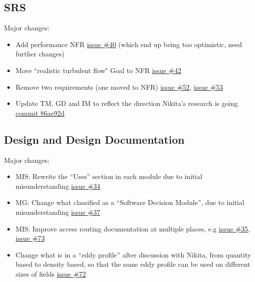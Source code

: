 \documentclass{article}
\begin{document}

\subsection{SRS}
Major changes:
\begin{itemize}
    \item Add performance NFR \href{https://github.com/omltcat/turbulent-flow/issues/40}{issue \#40} (which end up being too optimistic, need further changes)
    \item Move ``realistic turbulent flow" Goal to NFR \href{https://github.com/omltcat/turbulent-flow/issues/42}{issue \#42}
    \item Remove two requirements (one moved to NFR) \href{https://github.com/omltcat/turbulent-flow/issues/52}{issue \#52}, \href{https://github.com/omltcat/turbulent-flow/issues/53}{issue \#53}
    \item Update TM, GD and IM to reflect the direction Nikita's research is going \href{https://github.com/omltcat/turbulent-flow/commit/86ae92d744d9f19878fc19d52f57f824410bddc9}{commit 86ae92d}
\end{itemize}

\subsection{Design and Design Documentation}
Major changes:
\begin{itemize}
    \item MIS: Rewrite the ``Uses'' section in each module due to initial misunderstanding \href{https://github.com/omltcat/turbulent-flow/issues/34}{issue \#34}
    \item MG: Change what classified as a ``Software Decision Module'', due to initial misunderstanding \href{https://github.com/omltcat/turbulent-flow/issues/37}{issue \#37}
    \item MIS: Improve access routing documentation at multiple places, e.g \href{https://github.com/omltcat/turbulent-flow/issues/35}{issue \#35}, \href{https://github.com/omltcat/turbulent-flow/issues/73}{issue \#73}
    \item Change what is in a ``eddy profile'' after discussion with Nikita, from quantity based to density based, so that the same eddy profile can be used on different sizes of fields \href{https://github.com/omltcat/turbulent-flow/issues/72}{issue \#72}
\end{itemize}
\end{document}

